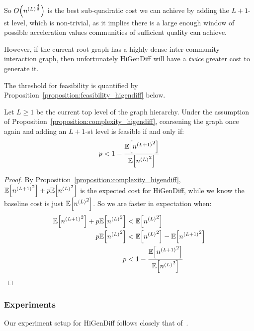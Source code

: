 So $O\mathopen{}\left({n^{\mathopen{}\left(L\right)}}^{\frac{4}{3}}\right)$ is the best sub-quadratic cost we can achieve by adding the $L+1$-st level, which is non-trivial, as it implies there is a large enough window of possible acceleration values communities of sufficient quality can achieve. 

However, if the current root graph has a highly dense inter-community interaction graph, then unfortunately HiGenDiff will have a \emph{twice} greater cost to generate it. 

The threshold for feasibility is quantified by Proposition~\ref{proposition:feasibility_higendiff} below.

\begin{proposition}
\label{proposition:feasibility_higendiff}
     Let $L \geq 1$ be the current top level of the graph hierarchy. Under the assumption of Proposition~\ref{proposition:complexity_higendiff}, coarsening the graph once again and adding an $L+1$-st level is feasible if and only if:
     \begin{equation}
            p < 1 - \frac{\mathbb{E}\mathopen{}\left[{n^{\mathopen{}\left(L+1\right)}}^2\right]}{\mathbb{E}\mathopen{}\left[{n^{\mathopen{}\left(L\right)}}^2\right]}
     \end{equation}
\end{proposition}
\begin{proof}
    By Proposition~\ref{proposition:complexity_higendiff}, $\mathbb{E}\mathopen{}\left[{n^{\mathopen{}\left(L+1\right)}}^2\right] + p \mathbb{E}\mathopen{}\left[{n^{\mathopen{}\left(L\right)}}^2\right]$ is the expected cost for HiGenDiff, while we know the baseline cost is just $\mathbb{E}\mathopen{}\left[{n^{\mathopen{}\left(L\right)}}^2\right]$. So we are faster in expectation when:
    \begin{align}
        \begin{split}
            \mathbb{E}\mathopen{}\left[{n^{\mathopen{}\left(L+1\right)}}^2\right] + p \mathbb{E}\mathopen{}\left[{n^{\mathopen{}\left(L\right)}}^2\right] &< \mathbb{E}\mathopen{}\left[{n^{\mathopen{}\left(L\right)}}^2\right] \\
            p \mathbb{E}\mathopen{}\left[{n^{\mathopen{}\left(L\right)}}^2\right] &< \mathbb{E}\mathopen{}\left[{n^{\mathopen{}\left(L\right)}}^2\right] - \mathbb{E}\mathopen{}\left[{n^{\mathopen{}\left(L+1\right)}}^2\right]  \\
            p &< 1 - \frac{\mathbb{E}\mathopen{}\left[{n^{\mathopen{}\left(L+1\right)}}^2\right]}{\mathbb{E}\mathopen{}\left[{n^{\mathopen{}\left(L\right)}}^2\right]}
        \end{split}
    \end{align}
\end{proof}

\subsubsection{Experiments}

Our experiment setup for HiGenDiff follows closely that of~\cite{karami_multi-resolution_2024}. 

